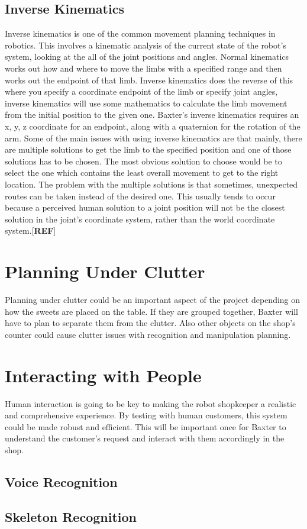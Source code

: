 \subsection{Inverse Kinematics}
Inverse kinematics is one of the common movement planning techniques in robotics. This involves a kinematic analysis of the current state of the robot's system, looking at the all of the joint positions and angles. Normal kinematics works out how and where to move the limbs with a specified range and then works out the endpoint of that limb. Inverse kinematics does the reverse of this where you specify a coordinate endpoint of the limb or specify joint angles, inverse kinematics will use some mathematics to calculate the limb movement from the initial position to the given one. Baxter's inverse kinematics requires an x, y, z coordinate for an endpoint, along with a quaternion for the rotation of the arm.
\newline\newline
Some of the main issues with using inverse kinematics are that mainly, there are multiple solutions to get the limb to the specified position and one of those solutions has to be chosen. The most obvious solution to choose would be to select the one which contains the least overall movement to get to the right location. The problem with the multiple solutions is that sometimes, unexpected routes can be taken instead of the desired one. This usually tends to occur because a perceived human solution to a joint position will not be the closest solution in the joint's coordinate system, rather than the world coordinate system.[\textbf{REF}]
\section{Planning Under Clutter}
Planning under clutter could be an important aspect of the project depending on how the sweets are placed on the table. If they are grouped together, Baxter will have to plan to separate them from the clutter. Also other objects on the shop's counter could cause clutter issues with recognition and manipulation planning.
\section{Interacting with People}
Human interaction is going to be key to making the robot shopkeeper a realistic and comprehensive experience. By testing with human customers, this system could be made robust and efficient. This will be important once for Baxter to understand the customer's request and interact with them accordingly in the shop.
\subsection{Voice Recognition}
\subsection{Skeleton Recognition}